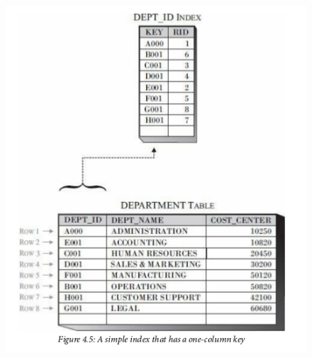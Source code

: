\documentclass{article}
\begin{document}
\begin{itemize}
\begin{itemize}
		\begin{figure}[h]
		\centering
		\includegraphics[scale=0.5]{index.png}
 

\end{figure}
\end{itemize}
\end{itemize}
\end{document}
